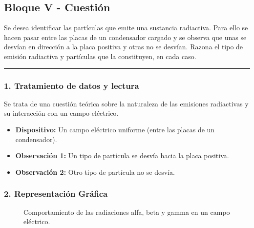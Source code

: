 \newpage
\subsection{Bloque V - Cuestión}
\label{subsec:A5_2014_jun_ord}

\begin{cajaenunciado}
Se desea identificar las partículas que emite una sustancia radiactiva. Para ello se hacen pasar entre las placas de un condensador cargado y se observa que unas se desvían en dirección a la placa positiva y otras no se desvían. Razona el tipo de emisión radiactiva y partículas que la constituyen, en cada caso.
\end{cajaenunciado}
\hrule

\subsubsection*{1. Tratamiento de datos y lectura}
Se trata de una cuestión teórica sobre la naturaleza de las emisiones radiactivas y su interacción con un campo eléctrico.
\begin{itemize}
    \item \textbf{Dispositivo:} Un campo eléctrico uniforme (entre las placas de un condensador).
    \item \textbf{Observación 1:} Un tipo de partícula se desvía hacia la placa positiva.
    \item \textbf{Observación 2:} Otro tipo de partícula no se desvía.
\end{itemize}

\subsubsection*{2. Representación Gráfica}
\begin{figure}[H]
    \centering
    \caption{Comportamiento de las radiaciones alfa, beta y gamma en un campo eléctrico.}
\end{figure}

